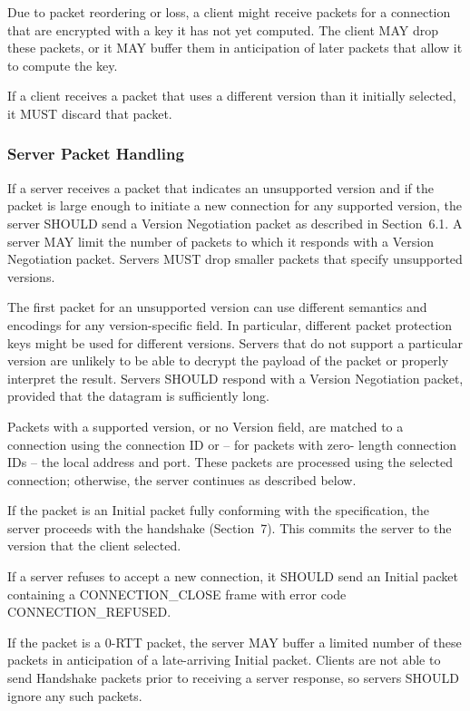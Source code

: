 \documentclass{article}
\begin{document}
Due to packet reordering or loss, a client might receive packets for a connection that are encrypted with a key it has not yet computed. The client MAY drop these packets, or it MAY buffer them in anticipation of later packets that allow it to compute the key.

If a client receives a packet that uses a different version than it initially selected, it MUST discard that packet.

\subsubsection{Server Packet Handling}

If a server receives a packet that indicates an unsupported version and if the packet is large enough to initiate a new connection for any supported version, the server SHOULD send a Version Negotiation packet as described in Section~6.1.  A server MAY limit the number of packets to which it responds with a Version Negotiation packet. Servers MUST drop smaller packets that specify unsupported versions.

The first packet for an unsupported version can use different semantics and encodings for any version-specific field.  In particular, different packet protection keys might be used for different versions.  Servers that do not support a particular version are unlikely to be able to decrypt the payload of the packet or properly interpret the result.  Servers SHOULD respond with a Version Negotiation packet, provided that the datagram is sufficiently long.

Packets with a supported version, or no Version field, are matched to a connection using the connection ID or -- for packets with zero- length connection IDs -- the local address and port.  These packets are processed using the selected connection; otherwise, the server continues as described below.

If the packet is an Initial packet fully conforming with the specification, the server proceeds with the handshake (Section~7). This commits the server to the version that the client selected.

If a server refuses to accept a new connection, it SHOULD send an Initial packet containing a CONNECTION\_CLOSE frame with error code CONNECTION\_REFUSED.

If the packet is a 0-RTT packet, the server MAY buffer a limited number of these packets in anticipation of a late-arriving Initial packet.  Clients are not able to send Handshake packets prior to receiving a server response, so servers SHOULD ignore any such packets.
\end{document}
